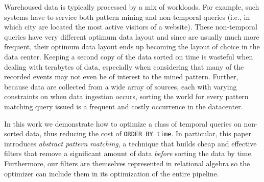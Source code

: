 Warehoused data is typically processed by a mix of workloads.  For
example, such systems have to service both pattern mining and non-temporal 
queries (i.e., in which city are located the most active visitors of a 
website).  
These non-temporal queries have very different optimum data layout and since are
usually much more frequent, their optimum data layout ends up becoming the
layout of choice in the data center.  Keeping a second copy of the data sorted
on time is wasteful when dealing with terabytes of data, especially when 
considering that many of the recorded events may not even be of interest to the
mined pattern. 
Further, because data are collected from a wide array of
sources, each with varying constraints on when data ingestion occurs, sorting
the world for every pattern matching query issued is a frequent and costly 
occurrence in the datacenter.
%

In this work we demonstrate how to optimize a class of temporal queries on
non-sorted data, thus reducing the cost of \texttt{ORDER BY time}. In
particular, this paper introduces {\em abstract pattern matching}, a technique
that builds cheap and effective filters that remove a significant amount of data
\emph{before} sorting the data by time.  Furthermore, our filters are themselves
represented in relational algebra so the optimizer can include them in its
optimization of the entire pipeline.


